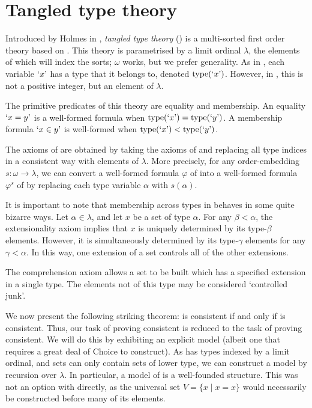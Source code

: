 \section{Tangled type theory}
\label{ss:theories:ttt}

Introduced by Holmes in \cite{holmes-ttt}, \emph{tangled type theory} ({\TTT}) is a multi-sorted first order theory based on {\TST}.
This theory is parametrised by a limit ordinal \( \lambda \), the elements of which will index the sorts; \( \omega \) works, but we prefer generality.
As in {\TST}, each variable \( \mquote{x} \) has a type that it belongs to, denoted \( \ttype(\mquote x) \).
However, in {\TTT}, this is not a positive integer, but an element of \( \lambda \).

The primitive predicates of this theory are equality and membership.
An equality \( \mquote{x = y} \) is a well-formed formula when \( \ttype(\mquote{x}) = \ttype(\mquote{y}) \).
A membership formula \( \mquote{x \in y} \) is well-formed when \( \ttype(\mquote{x}) < \ttype(\mquote{y}) \).

The axioms of {\TTT} are obtained by taking the axioms of {\TST} and replacing all type indices in a consistent way with elements of \( \lambda \).
More precisely, for any order-embedding \( s : \omega \to \lambda \), we can convert a well-formed formula \( \varphi \) of {\TST} into a well-formed formula \( \varphi^s \) of {\TTT} by replacing each type variable \( \alpha \) with \( s(\alpha) \).

It is important to note that membership across types in {\TTT} behaves in some quite bizarre ways.
Let \( \alpha \in \lambda \), and let \( x \) be a set of type \( \alpha \).
For any \( \beta < \alpha \), the extensionality axiom implies that \( x \) is uniquely determined by its type-\( \beta \) elements.
However, it is simultaneously determined by its type-\( \gamma \) elements for any \( \gamma < \alpha \).
In this way, one extension of a set controls all of the other extensions.

The comprehension axiom allows a set to be built which has a specified extension in a single type.
The elements not of this type may be considered `controlled junk'.

We now present the following striking theorem:
{\NF} is consistent if and only if {\TTT} is consistent. \cite{holmes-ttt}
Thus, our task of proving {\NF} consistent is reduced to the task of proving {\TTT} consistent.
We will do this by exhibiting an explicit model (albeit one that requires a great deal of Choice to construct).
As {\TTT} has types indexed by a limit ordinal, and sets can only contain sets of lower type, we can construct a model by recursion over \( \lambda \).
In particular, a model of {\TTT} is a well-founded structure.
This was not an option with {\NF} directly, as the universal set \( V = \{ x \mid x = x \} \) would necessarily be constructed before many of its elements.

